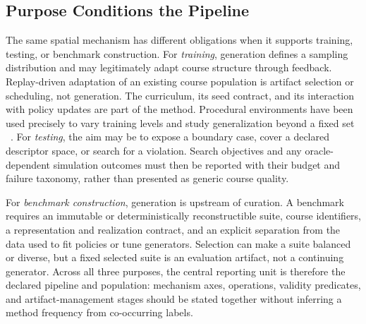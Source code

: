 \subsection{Purpose Conditions the Pipeline}

The same spatial mechanism has different obligations when it supports training,
testing, or benchmark construction.  For \emph{training}, generation defines a
sampling distribution and may legitimately adapt course structure through feedback.
Replay-driven adaptation of an existing course population is artifact selection or
scheduling, not generation.  The curriculum, its seed contract, and its interaction
with policy updates are part of the method.  Procedural environments have been used precisely to vary
training levels and study generalization beyond a fixed set
~\cite{Cobbe2020LeveragingProcedural,Li2020ImprovingGeneralization}.  For
\emph{testing}, the aim may be to expose a boundary case, cover a declared
descriptor space, or search for a violation.  Search objectives and any
oracle-dependent simulation outcomes must then be reported with their budget and
failure taxonomy, rather than presented as generic course quality.

For \emph{benchmark construction}, generation is upstream of curation.  A
benchmark requires an immutable or deterministically reconstructible suite,
course identifiers, a representation and realization contract, and an explicit
separation from the data used to fit policies or tune generators.  Selection can
make a suite balanced or diverse, but a fixed selected suite is an evaluation
artifact, not a continuing generator.  Across all three purposes, the central
reporting unit is therefore the declared pipeline and population: mechanism
axes, operations, validity predicates, and artifact-management stages should be
stated together without inferring a method frequency from co-occurring labels.
